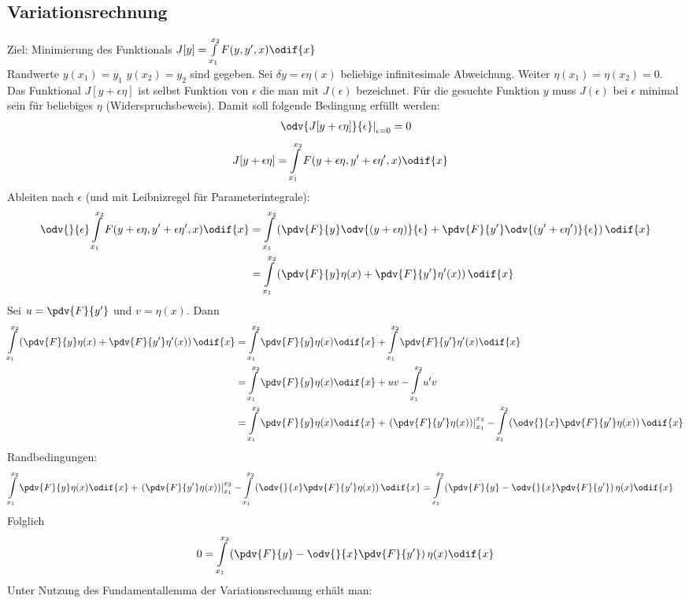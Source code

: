 \subsection{Variationsrechnung}
Ziel: Minimierung des Funktionals $J[y]=\int\limits_{x_1}^{x_2}F(y,y',x)\odif{x}$\\
Randwerte $y(x_1)=y_1$ $y(x_2)=y_2$ sind gegeben. Sei $\delta y = \epsilon \eta(x)$ beliebige infinitesimale Abweichung. Weiter $\eta(x_1)=\eta(x_2)=0$. Das Funktional $J[y+\epsilon \eta]$ ist selbst Funktion von $\epsilon$ die man mit $J(\epsilon)$ bezeichnet. Für die gesuchte Funktion $y$ muss $J(\epsilon)$ bei $\epsilon$ minimal sein für beliebiges $\eta$ (Widerspruchsbeweis). Damit soll folgende Bedingung erfüllt werden:
\begin{align*}
	\left.\odv{J[y+\epsilon\eta]}{\epsilon}\right|_{\epsilon =0}=0
\end{align*}
\begin{align*}
	J[y+\epsilon\eta]&=\int\limits_{x_1}^{x_2}F(y+\epsilon\eta, y'+\epsilon\eta', x)\odif{x}
\end{align*}
Ableiten nach $\epsilon$ (und mit Leibnizregel für Parameterintegrale):
\begin{align*}
	\odv{}{\epsilon}\int\limits_{x_1}^{x_2}F(y+\epsilon\eta, y'+\epsilon\eta', x)\odif{x}
	&=\int\limits_{x_1}^{x_2}\left(\pdv{F}{y}\odv{(y+\epsilon\eta)}{\epsilon}+\pdv{F}{y'}\odv{(y'+\epsilon\eta')}{\epsilon}\right)\odif{x}\\
	&=\int\limits_{x_1}^{x_2}\left(\pdv{F}{y}\eta(x)+\pdv{F}{y'}\eta'(x)\right)\odif{x}
\end{align*}
Sei $u=\pdv{F}{y'}$ und $v=\eta(x)$. Dann 
\begin{align*}
	\int\limits_{x_1}^{x_2}\left(\pdv{F}{y}\eta(x)+\pdv{F}{y'}\eta'(x)\right)\odif{x}
	&= \int\limits_{x_1}^{x_2}\pdv{F}{y}\eta(x)\odif{x} +\int\limits_{x_1}^{x_2}\pdv{F}{y'}\eta'(x)\odif{x}\\
	&= \int\limits_{x_1}^{x_2}\pdv{F}{y}\eta(x)\odif{x} + uv - \int\limits_{x_1}^{x_2}u'v\\
	&= \int\limits_{x_1}^{x_2}\pdv{F}{y}\eta(x)\odif{x} + \left.\left(\pdv{F}{y'}\eta(x)\right)\right|_{x_1}^{x_2} - \int\limits_{x_1}^{x_2}\left(\odv{}{x}\pdv{F}{y'}\eta(x)\right)\odif{x}\\
\end{align*}
Randbedingungen:
\begin{align*}
	\int\limits_{x_1}^{x_2}\pdv{F}{y}\eta(x)\odif{x} + \left.\left(\pdv{F}{y'}\eta(x)\right)\right|_{x_1}^{x_2} - \int\limits_{x_1}^{x_2}\left(\odv{}{x}\pdv{F}{y'}\eta(x)\right)\odif{x}
	&= \int\limits_{x_1}^{x_2}\left(\pdv{F}{y}-\odv{}{x}\pdv{F}{y'}\right)\eta(x)\odif{x}
\end{align*}
Folglich
\begin{align*}
	0=\int\limits_{x_1}^{x_2}\left(\pdv{F}{y}-\odv{}{x}\pdv{F}{y'}\right)\eta(x)\odif{x}
\end{align*}
Unter Nutzung des Fundamentallemma der Variationsrechnung erhält man:
